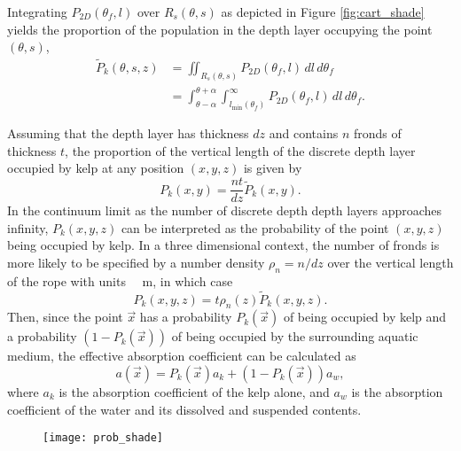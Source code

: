 Integrating $P_{2D}(\theta_f,l)$ over $R_s(\theta,s)$ as depicted in Figure \ref{fig:cart_shade} yields the proportion of the population in the depth layer occupying the point $(\theta,s)$,
\begin{align*}
		\tilde{P}_k(\theta,s,z)	&= \iint_{R_s(\theta,s)}
								P_{2D}(\theta_f,l)
								\,dl\,d\theta_f \nonumber \\
							&= \int_{\theta-\alpha}^{\theta+\alpha}
								\int_{l_{\min}(\theta_f)}^\infty
								P_{2D}(\theta_f,l)
								\,dl\,d\theta_f.
\end{align*}

Assuming that the depth layer has thickness $dz$ and contains $n$ fronds of thickness $t$,
the proportion of the vertical length of the discrete depth layer occupied by kelp at any position $(x,y,z)$ is given by
\begin{equation*}
  P_k(x, y) = \frac{nt}{dz}\tilde{P}_k(x, y).
\end{equation*}
In the continuum limit as the number of discrete depth depth layers approaches infinity, $P_k(x,y,z)$ can be interpreted as the probability of the point $(x,y,z)$ being occupied by kelp.
In a three dimensional context, the number of fronds is more likely to be specified by a number density $\rho_n=n/dz$ over the vertical length of the rope with units \SI{}{\per\m}, in which case
\begin{equation*}
  P_k(x, y, z) = t \rho_n(z) \tilde{P}_k(x, y, z).
\end{equation*}
Then, since the point $\vec{x}$ has a probability $P_k(\vec{x})$ of being occupied by kelp and a probability $(1-P_k(\vec{x}))$ of being occupied by the surrounding aquatic medium,
the effective absorption coefficient can be calculated as
\begin{equation*}
  a(\vec{x}) = P_k(\vec{x})a_k + (1-P_k(\vec{x}))a_w,
\end{equation*}
where $a_k$ is the absorption coefficient of the kelp alone, and $a_w$ is the absorption coefficient of the water and its dissolved and suspended contents.

\begin{figure}[h]
	\centering
	\texttt{[image: prob\_shade]}
	\label{fig:prob_shade}
\end{figure}

